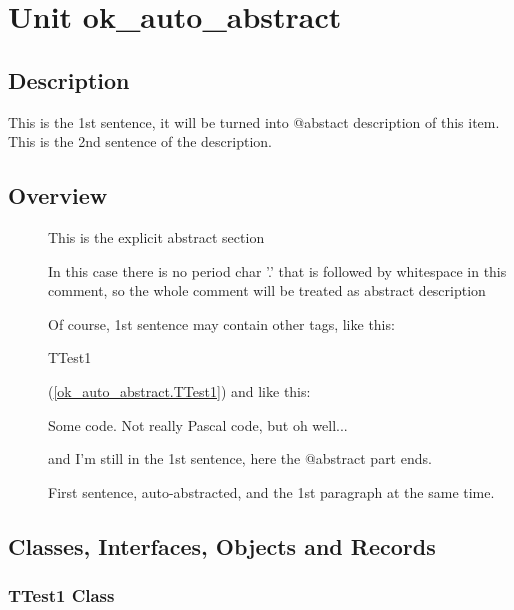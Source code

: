 \documentclass{report}
\begin{document}
\newlength{\tmplength}
\chapter{Unit ok{\_}auto{\_}abstract}
\section{Description}
This is the 1st sentence, it will be turned into @abstact description of this item. This is the 2nd sentence of the description.
\section{Overview}
\begin{description}
\item[\texttt{\begin{ttfamily}TTest1\end{ttfamily} Class}]This is the explicit abstract section
\item[\texttt{\begin{ttfamily}TTest2\end{ttfamily} Class}]In this case there is no period char '.' that is followed by whitespace in this comment, so the whole comment will be treated as abstract description
\item[\texttt{\begin{ttfamily}TTest3\end{ttfamily} Class}]Of course, 1st sentence may contain other tags, like this: \begin{ttfamily}TTest1\end{ttfamily}(\ref{ok_auto_abstract.TTest1}) and like this: \begin{ttfamily}Some code. Not really Pascal code, but oh well...\end{ttfamily} and I'm still in the 1st sentence, here the @abstract part ends.
\item[\texttt{\begin{ttfamily}TTest4\end{ttfamily} Class}]First sentence, auto{-}abstracted, and the 1st paragraph at the same time.
\end{description}
\section{Classes, Interfaces, Objects and Records}
\subsection*{TTest1 Class}
\end{document}
